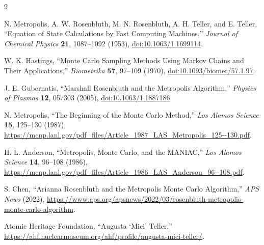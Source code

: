 \documentclass[11pt]{article}
\begin{document}
\begin{thebibliography}{9}

N. Metropolis, A. W. Rosenbluth, M. N. Rosenbluth, A. H. Teller, and E. Teller,
``Equation of State Calculations by Fast Computing Machines,''
\emph{Journal of Chemical Physics} \textbf{21}, 1087--1092 (1953),
\href{https://doi.org/10.1063/1.1699114}{doi:10.1063/1.1699114}.

W. K. Hastings,
``Monte Carlo Sampling Methods Using Markov Chains and Their Applications,''
\emph{Biometrika} \textbf{57}, 97--109 (1970),
\href{https://doi.org/10.1093/biomet/57.1.97}{doi:10.1093/biomet/57.1.97}.

J. E. Gubernatis,
``Marshall Rosenbluth and the Metropolis Algorithm,''
\emph{Physics of Plasmas} \textbf{12}, 057303 (2005),
\href{https://doi.org/10.1063/1.1887186}{doi:10.1063/1.1887186}.

N. Metropolis,
``The Beginning of the Monte Carlo Method,''
\emph{Los Alamos Science} \textbf{15}, 125--130 (1987),
\url{https://mcnp.lanl.gov/pdf_files/Article_1987_LAS_Metropolis_125--130.pdf}.

H. L. Anderson,
``Metropolis, Monte Carlo, and the MANIAC,''
\emph{Los Alamos Science} \textbf{14}, 96--108 (1986),
\url{https://mcnp.lanl.gov/pdf_files/Article_1986_LAS_Anderson_96--108.pdf}.

S. Chen,
``Arianna Rosenbluth and the Metropolis Monte Carlo Algorithm,''
\emph{APS News} (2022),
\url{https://www.aps.org/apsnews/2022/03/rosenbluth-metropolis-monte-carlo-algorithm}.

Atomic Heritage Foundation,
``Augusta `Mici' Teller,''
\url{https://ahf.nuclearmuseum.org/ahf/profile/augusta-mici-teller/}.

\end{thebibliography}
\end{document}

